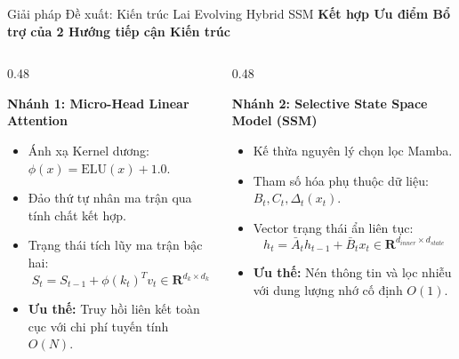\documentclass[aspectratio=169, 10pt]{beamer}
\begin{document}
\begin{frame}{Giải pháp Đề xuất: Kiến trúc Lai Evolving Hybrid SSM}
  \centering
  \textbf{\Large Kết hợp Ưu điểm Bổ trợ của 2 Hướng tiếp cận Kiến trúc}
  \vspace{0.3cm}
  \begin{columns}[t]
    \begin{column}{0.48\textwidth}
      \begin{block}{\textbf{Nhánh 1: Micro-Head Linear Attention}}
        \begin{itemize}
          \item Ánh xạ Kernel dương: $\phi(x) = \text{ELU}(x) + 1.0$.
          \item Đảo thứ tự nhân ma trận qua tính chất kết hợp.
          \item Trạng thái tích lũy ma trận bậc hai:
            $$S_t = S_{t-1} + \phi(k_t)^T v_t \in \mathbf{R}^{d_k \times d_k}$$
          \item \textbf{Ưu thế:} Truy hồi liên kết toàn cục với chi phí tuyến tính $O(N)$.
        \end{itemize}
      \end{block}
    \end{column}
    \begin{column}{0.48\textwidth}
      \begin{block}{\textbf{Nhánh 2: Selective State Space Model (SSM)}}
        \begin{itemize}
          \item Kế thừa nguyên lý chọn lọc Mamba.
          \item Tham số hóa phụ thuộc dữ liệu: $B_t, C_t, \Delta_t(x_t)$.
          \item Vector trạng thái ẩn liên tục:
            $$h_t = \bar{A}_t h_{t-1} + \bar{B}_t x_t \in \mathbf{R}^{d_{inner} \times d_{state}}$$
          \item \textbf{Ưu thế:} Nén thông tin và lọc nhiễu với dung lượng nhớ cố định $O(1)$.
        \end{itemize}
      \end{block}
    \end{column}
  \end{columns}
\end{frame}
\end{document}
